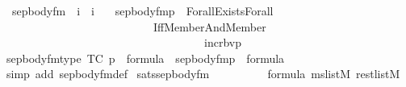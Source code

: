 \begin{isabellebody}
\isamarkupfalse%
\isanewline
\ \ sep{\isacharunderscore}{\kern0pt}body{\isacharunderscore}{\kern0pt}fm\ {\isacharcolon}{\kern0pt}{\isacharcolon}{\kern0pt}\ {\isachardoublequoteopen}i\ {\isasymRightarrow}\ i{\isachardoublequoteclose}\ \isanewline
\ \ {\isachardoublequoteopen}sep{\isacharunderscore}{\kern0pt}body{\isacharunderscore}{\kern0pt}fm{\isacharparenleft}{\kern0pt}p{\isacharparenright}{\kern0pt}\ {\isasymequiv}\ Forall{\isacharparenleft}{\kern0pt}Exists{\isacharparenleft}{\kern0pt}Forall{\isacharparenleft}{\kern0pt}\isanewline
\ \ \ \ \ \ \ \ \ \ \ \ \ \ \ \ \ \ \ \ \ \ \ \ \ \ \ Iff{\isacharparenleft}{\kern0pt}Member{\isacharparenleft}{\kern0pt}{}{\isacharcomma}{\kern0pt}{}{\isacharparenright}{\kern0pt}{\isacharcomma}{\kern0pt}And{\isacharparenleft}{\kern0pt}Member{\isacharparenleft}{\kern0pt}{}{\isacharcomma}{\kern0pt}{}{\isacharparenright}{\kern0pt}{\isacharcomma}{\kern0pt}\isanewline
\ \ \ \ \ \ \ \ \ \ \ \ \ \ \ \ \ \ \ \ \ \ \ \ \ \ \ \ \ \ \ \ \ \ \ \ incr{\isacharunderscore}{\kern0pt}bv{}{\isacharcircum}{\kern0pt}{}{\isacharparenleft}{\kern0pt}p{\isacharparenright}{\kern0pt}{\isacharparenright}{\kern0pt}{\isacharparenright}{\kern0pt}{\isacharparenright}{\kern0pt}{\isacharparenright}{\kern0pt}{\isacharparenright}{\kern0pt}{\isachardoublequoteclose}\isanewline
\isanewline
{}\isamarkupfalse%
\ sep{\isacharunderscore}{\kern0pt}body{\isacharunderscore}{\kern0pt}fm{\isacharunderscore}{\kern0pt}type\ {\isacharbrackleft}{\kern0pt}TC{\isacharbrackright}{\kern0pt}{\isacharcolon}{\kern0pt}\ {\isachardoublequoteopen}p\ {\isasymin}\ formula\ {\isasymLongrightarrow}\ sep{\isacharunderscore}{\kern0pt}body{\isacharunderscore}{\kern0pt}fm{\isacharparenleft}{\kern0pt}p{\isacharparenright}{\kern0pt}\ {\isasymin}\ formula{\isachardoublequoteclose}\isanewline
%
\isadelimproof
\ \ %
\endisadelimproof
%
\isatagproof
{}\isamarkupfalse%
\ {\isacharparenleft}{\kern0pt}simp\ add{\isacharcolon}{\kern0pt}\ sep{\isacharunderscore}{\kern0pt}body{\isacharunderscore}{\kern0pt}fm{\isacharunderscore}{\kern0pt}def{\isacharparenright}{\kern0pt}%
\endisatagproof
{\isafoldproof}%
%
\isadelimproof
\isanewline
%
\endisadelimproof
\isanewline
{}\isamarkupfalse%
\ sats{\isacharunderscore}{\kern0pt}sep{\isacharunderscore}{\kern0pt}body{\isacharunderscore}{\kern0pt}fm{\isacharcolon}{\kern0pt}\ \isanewline
\ \ \isanewline
\ \ \ \ {\isachardoublequoteopen}{\isasymphi}\ {\isasymin}\ formula{\isachardoublequoteclose}\ {\isachardoublequoteopen}ms{\isasymin}list{\isacharparenleft}{\kern0pt}M{\isacharparenright}{\kern0pt}{\isachardoublequoteclose}\ {\isachardoublequoteopen}rest{\isasymin}list{\isacharparenleft}{\kern0pt}M{\isacharparenright}{\kern0pt}{\isachardoublequoteclose}\isanewline

\end{isabellebody}
